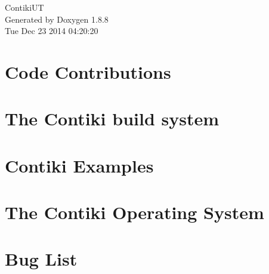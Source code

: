 \documentclass[twoside]{book}
\newcommand{\+}{\discretionary{\mbox{\scriptsize$\hookleftarrow$}}{}{}}
\newcommand{\clearemptydoublepage}{%
  \newpage{\pagestyle{empty}\cleardoublepage}%
}
\begin{document}
\hypersetup{pageanchor=false,
             bookmarks=true,
             bookmarksnumbered=true,
             pdfencoding=unicode
            }
\begin{titlepage}
\vspace*{7cm}
\begin{center}%
{\Large Contiki\+U\+T }\\
\vspace*{1cm}
{\large Generated by Doxygen 1.8.8}\\
\vspace*{0.5cm}
{\small Tue Dec 23 2014 04:20:20}\\
\end{center}
\end{titlepage}
\clearemptydoublepage
\tableofcontents
\clearemptydoublepage
{}
\hypersetup{pageanchor=true}

\chapter{Code Contributions}
\label{md__home_user_contikiUT_contiki_CONTRIBUTING}
\hypertarget{md__home_user_contikiUT_contiki_CONTRIBUTING}{}

\chapter{The Contiki build system}
\label{md__home_user_contikiUT_contiki_README-BUILDING}
\hypertarget{md__home_user_contikiUT_contiki_README-BUILDING}{}

\chapter{Contiki Examples}
\label{md__home_user_contikiUT_contiki_README-EXAMPLES}
\hypertarget{md__home_user_contikiUT_contiki_README-EXAMPLES}{}

\chapter{The Contiki Operating System}
\label{md__home_user_contikiUT_contiki_README}
\hypertarget{md__home_user_contikiUT_contiki_README}{}

\chapter{Bug List}
\label{bug}
\hypertarget{bug}{}

\end{document}
